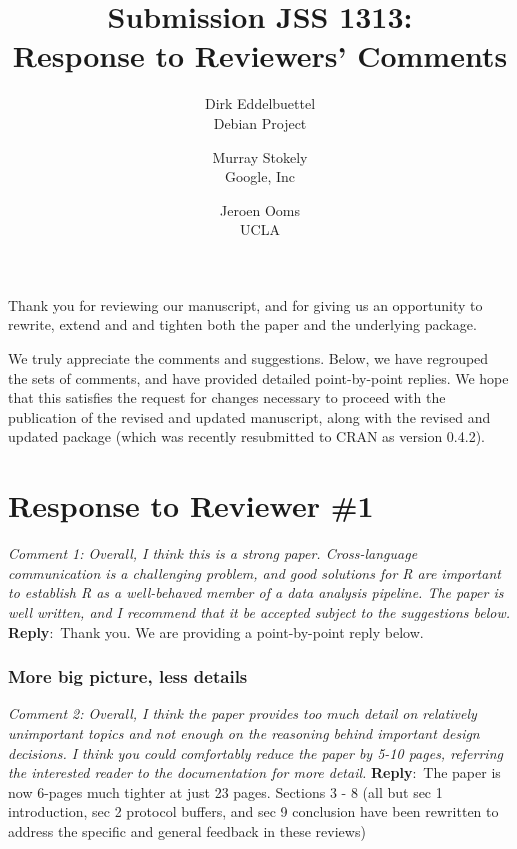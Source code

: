 \documentclass[10pt]{article}
\newcommand{\pointRaised}[2]{\smallskip %
  \textsl{{\fontseries{b}\selectfont #1}: #2}\newline}
\newcommand{\reply}[1]{\textbf{Reply}:\ #1 \smallskip } %
\begin{document}
\author{Dirk Eddelbuettel\\Debian Project \and 
        Murray Stokely\\Google, Inc \and
        Jeroen Ooms\\UCLA}
\title{Submission JSS 1313: \\ Response to Reviewers' Comments}
\maketitle 
\thispagestyle{empty}

Thank you for reviewing our manuscript, and for giving us an opportunity to
rewrite, extend and and tighten both the paper and the underlying package.

\smallskip
We truly appreciate the comments and suggestions. Below, we have regrouped the sets
of comments, and have provided detailed point-by-point replies.
%
We hope that this satisfies the request for changes necessary to proceed with
the publication of the revised and updated manuscript, along with the revised
and updated package (which was recently resubmitted to CRAN as version 0.4.2).

\section*{Response to Reviewer \#1}

\pointRaised{Comment 1}{Overall, I think this is a strong paper. Cross-language communication
  is a challenging problem, and good solutions for R are important to
  establish R as a well-behaved member of a data analysis pipeline. The
  paper is well written, and I recommend that it be accepted subject to
  the suggestions below.}
\reply{Thank you. We are providing a point-by-point reply below.}

\subsubsection*{More big picture, less details}

\pointRaised{Comment 2}{Overall, I think the paper provides too much detail on
  relatively unimportant topics and not enough on the reasoning behind
  important design decisions. I think you could comfortably reduce the paper
  by 5-10 pages, referring the interested reader to the documentation for
  more detail.}
\reply{The paper is now 6-pages much tighter at just 23 pages.
  Sections 3 - 8 (all but sec 1 introduction, sec 2 protocol buffers,
  and sec 9 conclusion have been rewritten to address the specific and
  general feedback in these reviews)}
\end{document}
